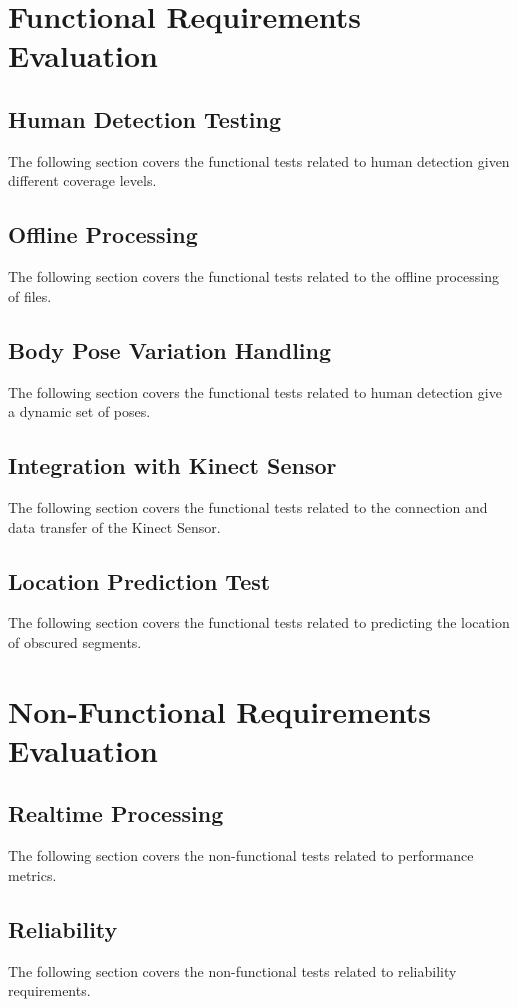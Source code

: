 \documentclass[12pt, titlepage]{article}
\begin{document}
\section{Functional Requirements Evaluation}

\subsection{Human Detection Testing}
The following section covers the functional tests related to human detection given different coverage levels.

\subsection{Offline Processing}
The following section covers the functional tests related to the offline processing of files.

\subsection{Body Pose Variation Handling}
The following section covers the functional tests related to human detection give a dynamic set of poses.

\subsection{Integration with Kinect Sensor}
The following section covers the functional tests related to the connection and data transfer of the Kinect Sensor.

\subsection{Location Prediction Test}
The following section covers the functional tests related to predicting the location of obscured segments.

\section{Non-Functional Requirements Evaluation}

\subsection{Realtime Processing}
The following section covers the non-functional tests related to performance metrics.
		
\subsection{Reliability}
The following section covers the non-functional tests related to reliability requirements.
\end{document}
